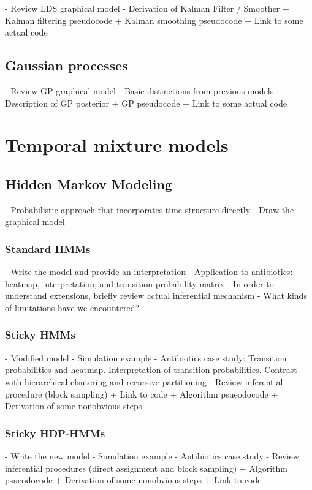 \documentclass{report}
\begin{document}
- Review LDS graphical model
- Derivation of Kalman Filter / Smoother
  + Kalman filtering pseudocode
  + Kalman smoothing pseudocode
  + Link to some actual code

\subsection{Gaussian processes}
- Review GP graphical model
- Basic distinctions from previous models
- Description of GP posterior
  + GP pseudocode
  + Link to some actual code

\section{Temporal mixture models}

\subsection{Hidden Markov Modeling}

- Probabilistic approach that incorporates time structure directly
- Draw the graphical model

\subsubsection{Standard HMMs}

- Write the model and provide an interpretation
- Application to antibiotics: heatmap, interpretation, and transition
probability matrix
- In order to understand extensions, briefly review actual inferential mechanism
- What kinds of limitations have we encountered?

\subsubsection{Sticky HMMs}

- Modified model
- Simulation example
- Antibiotics case study: Transition probabilities and heatmap. Interpretation
of transition probabilities. Contrast with hierarchical clsutering and recursive
partitioning
- Review inferential procedure (block sampling)
  + Link to code
  + Algorithm psueodocode
  + Derivation of some nonobvious steps

\subsubsection{Sticky HDP-HMMs}

- Write the new model
- Simulation example
- Antibiotics case study
- Review inferential procedures (direct assignment and block sampling)
  + Algorithm psueodocode
  + Derivation of some nonobvious steps
  + Link to code
\end{document}
